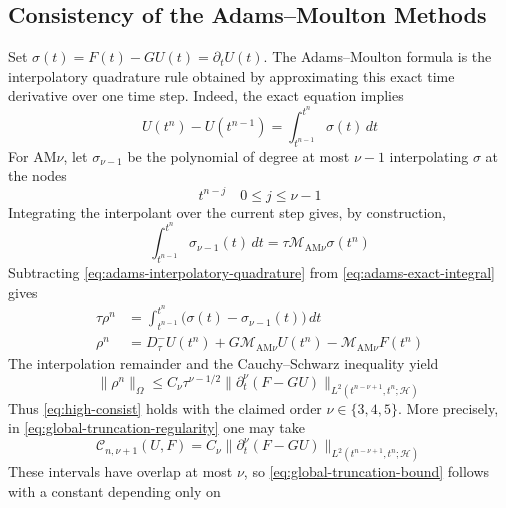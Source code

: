 \documentclass[11pt]{article}
\begin{document}
\subsection{Consistency of the Adams--Moulton Methods}
\label{sec:trunc-adams}
Set \(\sigma(t)=F(t)-GU(t)=\partial_tU(t)\). The Adams--Moulton formula is the
interpolatory quadrature rule obtained by approximating this exact time
derivative over one time step. Indeed, the exact equation implies
\begin{equation}
U(t^n)-U(t^{n-1})=\int_{t^{n-1}}^{t^n}\sigma(t)\,dt \label{eq:adams-exact-integral}
\end{equation}
For AM\(\nu\), let \(\sigma_{\nu-1}\) be the polynomial of degree at most
\(\nu-1\) interpolating \(\sigma\) at the nodes
\begin{equation}
t^{n-j}\quad 0\le j\le \nu-1 \label{eq:adams-interpolation-nodes}
\end{equation}
Integrating the interpolant over the current step gives, by construction,
\begin{equation}
\int_{t^{n-1}}^{t^n}\sigma_{\nu-1}(t)\,dt
=\tau\mathcal M_{\mathrm{AM}\nu}\sigma(t^n) \label{eq:adams-interpolatory-quadrature}
\end{equation}
Subtracting \eqref{eq:adams-interpolatory-quadrature} from
\eqref{eq:adams-exact-integral} gives
\begin{align}
\tau\rho^n
&=\int_{t^{n-1}}^{t^n}\bigl(\sigma(t)-\sigma_{\nu-1}(t)\bigr)\,dt \label{eq:adams-truncation-integral}\\
\rho^n
&=D_{\tau}^{-}U(t^n)+G\mathcal M_{\mathrm{AM}\nu}U(t^n)
-\mathcal M_{\mathrm{AM}\nu}F(t^n) \label{eq:adams-truncation-residual}
\end{align}
The interpolation remainder and the Cauchy--Schwarz inequality yield
\begin{equation}
\|\rho^n\|_{\Omega}
\le C_\nu\tau^{\nu-1/2}
\|\partial_t^\nu(F-GU)\|_{L^2(t^{n-\nu+1},t^n;\mathcal H)} \label{eq:adams-truncation-bound}
\end{equation}
Thus \eqref{eq:high-consist} holds with the claimed order
\(\nu\in\{3,4,5\}\). More precisely, in
\eqref{eq:global-truncation-regularity} one may take
\begin{equation}
\mathcal C_{n,\nu+1}(U,F)
=C_\nu\|\partial_t^\nu(F-GU)\|_{L^2(t^{n-\nu+1},t^n;\mathcal H)}
\label{eq:am-local-truncation-regularity}
\end{equation}
These intervals have overlap at most \(\nu\), so
\eqref{eq:global-truncation-bound} follows with a constant depending only on
\end{document}
